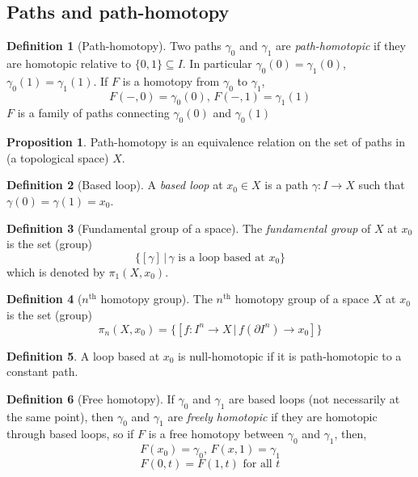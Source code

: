 \documentclass[a4paper,14pt]{extarticle}
\theoremstyle{definition}
\newtheorem*{definition}{Definition}
\newtheorem*{proposition}{Proposition}
\begin{document}
\subsection{Paths and path-homotopy}

\begin{definition}[Path-homotopy]
  Two paths $\gamma_0$ and $\gamma_1$ are \emph{path-homotopic} if they are homotopic 
  relative to $\{0,1\}\subseteq I$. In particular $\gamma_0(0)=\gamma_1(0)$, 
  $\gamma_0(1)=\gamma_1(1)$. If $F$ is a homotopy from $\gamma_0$ to $\gamma_1$,
  \[F(-,0)=\gamma_0(0), \,F(-,1)=\gamma_1(1)\] $F$ is a family of paths connecting 
  $\gamma_0(0)$ and $\gamma_0(1)$
\end{definition}

\begin{proposition}
  Path-homotopy is an equivalence relation on the set of paths in (a topological space) $X$.
\end{proposition}

\begin{definition}[Based loop]
  A \emph{based loop} at $x_0\in X$ is a path $\gamma:I\rightarrow X$ such that 
  $\gamma(0)=\gamma(1)=x_0$.
\end{definition}

\begin{definition}[Fundamental group of a space]
  The \emph{fundamental group} of $X$ at $x_0$ is the set (group)
  \[\{[\gamma]\,|\,\gamma\text{ is a loop based at }x_0\}\]
  which is denoted by $\pi_1(X,x_0)$.
\end{definition}

\begin{definition}[$n^{\text{th}}$ homotopy group]
  The $n^{\text{th}}$ homotopy group of a space $X$ at $x_0$ is the set (group)
  \[\pi_n(X,x_0)=\{[f:I^n\rightarrow X\,|\,f(\partial I^n)\rightarrow x_0]\}\]
\end{definition}

\begin{definition}
  A loop based at $x_0$ is null-homotopic if it is path-homotopic to a constant path.
\end{definition}

\begin{definition}[Free homotopy]
  If $\gamma_0$ and $\gamma_1$ are based loops (not necessarily at the same point), then 
  $\gamma_0$ and $\gamma_1$ are \emph{freely homotopic} if they are homotopic through 
  based loops, so if $F$ is a free homotopy between $\gamma_0$ and $\gamma_1$, then,
  \[F(x_0)=\gamma_0, \,F(x,1)=\gamma_1\] \[F(0,t)=F(1,t)\text{ for all }t\]
\end{definition}
\end{document}
